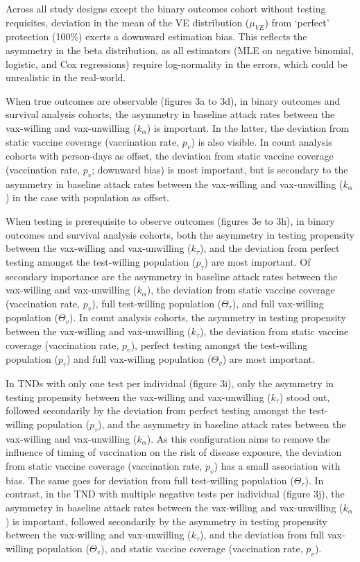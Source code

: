 \documentclass[12pt]{article}
\begin{document}
Across all study designs except the binary outcomes cohort without testing requisites, deviation in the mean of the VE distribution ($\mu_{VE}$) from `perfect' protection (100\%) exerts a downward estimation bias. This reflects the asymmetry in the beta distribution, as all estimators (MLE on negative binomial, logistic, and Cox regressions) require log-normality in the errors, which could be unrealistic in the real-world. 

When true outcomes are observable (figures 3a to 3d), in binary outcomes and survival analysis cohorts, the asymmetry in baseline attack rates between the vax-willing and vax-unwilling ($k_\alpha$) is important. In the latter, the deviation from static vaccine coverage (vaccination rate, $p_v$) is also visible. In count analysis cohorts with person-days as offset, the deviation from static vaccine coverage (vaccination rate, $p_v$; downward bias) is most important, but is secondary to the asymmetry in baseline attack rates between the vax-willing and vax-unwilling ($k_\alpha$) in the case with population as offset. 

When testing is prerequisite to observe outcomes (figures 3e to 3h), in binary outcomes and survival analysis cohorts, both the asymmetry in testing propensity between the vax-willing and vax-unwilling ($k_\tau$), and the deviation from perfect testing amongst the test-willing population ($p_\tau$) are most important. Of secondary importance are the asymmetry in baseline attack rates between the vax-willing and vax-unwilling ($k_\alpha$), the deviation from static vaccine coverage (vaccination rate, $p_v$), full test-willing population ($\Theta_{\tau}$), and full vax-willing population ($\Theta_{v}$). In count analysis cohorts, the asymmetry in testing propensity between the vax-willing and vax-unwilling ($k_\tau$), the deviation from static vaccine coverage (vaccination rate, $p_v$), perfect testing amongst the test-willing population ($p_\tau$) and full vax-willing population ($\Theta_{v}$) are most important.

In TNDs with only one test per individual (figure 3i), only the asymmetry in testing propensity between the vax-willing and vax-unwilling ($k_\tau$) stood out, followed secondarily by the deviation from perfect testing amongst the test-willing population ($p_\tau$), and the asymmetry in baseline attack rates between the vax-willing and vax-unwilling ($k_\alpha$). As this configuration aims to remove the influence of timing of vaccination on the risk of disease exposure, the deviation from static vaccine coverage (vaccination rate, $p_v$) has a small association with bias. The same goes for deviation from full test-willing population ($\Theta_{\tau}$). In contrast, in the TND with multiple negative tests per individual (figure 3j), the asymmetry in baseline attack rates between the vax-willing and vax-unwilling ($k_\alpha$) is important, followed secondarily by the asymmetry in testing propensity between the vax-willing and vax-unwilling ($k_\tau$), and the deviation from full vax-willing population ($\Theta_{v}$), and static vaccine coverage (vaccination rate, $p_v$).
\end{document}
